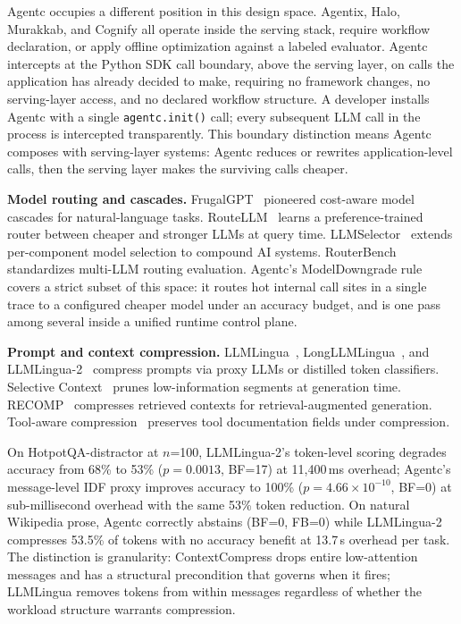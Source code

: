 \documentclass[sigconf,9pt]{acmart}
\begin{document}
Agentc occupies a different position in this design space. Agentix, Halo, Murakkab,
and Cognify all operate inside the serving stack, require workflow declaration, or
apply offline optimization against a labeled evaluator. Agentc intercepts at the
Python SDK call boundary, above the serving layer, on calls the application has
already decided to make, requiring no framework changes, no serving-layer access, and
no declared workflow structure. A developer installs Agentc with a single
\texttt{agentc.init()} call; every subsequent LLM call in the process is intercepted
transparently. This boundary distinction means Agentc composes with serving-layer
systems: Agentc reduces or rewrites application-level calls, then the serving layer
makes the surviving calls cheaper.

\textbf{Model routing and cascades.} FrugalGPT~\cite{chen2024frugalgpt} pioneered
cost-aware model cascades for natural-language tasks. RouteLLM~\cite{ong2025routellm}
learns a preference-trained router between cheaper and stronger LLMs at query time.
LLMSelector~\cite{chen2025llmselector} extends per-component model selection to
compound AI systems. RouterBench~\cite{hu2024routerbench} standardizes multi-LLM
routing evaluation. Agentc's ModelDowngrade rule covers a strict subset of this
space: it routes hot internal call sites in a single trace to a configured cheaper
model under an accuracy budget, and is one pass among several inside a unified runtime
control plane.

\textbf{Prompt and context compression.} LLMLingua~\cite{jiang2023llmlingua},
LongLLMLingua~\cite{jiang2024longllmlingua}, and
LLMLingua-2~\cite{pan2024llmlingua2} compress prompts via proxy LLMs or distilled
token classifiers. Selective Context~\cite{li2023selective} prunes low-information
segments at generation time. RECOMP~\cite{xu2024recomp} compresses retrieved contexts
for retrieval-augmented generation. Tool-aware
compression~\cite{xu2024toolcompress} preserves tool documentation fields under
compression.

On HotpotQA-distractor at $n$=100, LLMLingua-2's token-level scoring degrades
accuracy from 68\% to 53\% ($p=0.0013$, BF=17) at 11{,}400\,ms overhead; Agentc's
message-level IDF proxy improves accuracy to 100\% ($p=4.66\times10^{-10}$, BF=0) at
sub-millisecond overhead with the same 53\% token reduction. On natural Wikipedia
prose, Agentc correctly abstains (BF=0, FB=0) while LLMLingua-2 compresses 53.5\%
of tokens with no accuracy benefit at 13.7\,s overhead per task. The distinction is
granularity: ContextCompress drops entire low-attention messages and has a structural
precondition that governs when it fires; LLMLingua removes tokens from within messages
regardless of whether the workload structure warrants compression.
\end{document}

